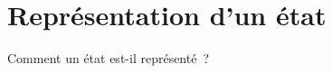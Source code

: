 \chapter{Représentation d'un état} \label{chapter:representation-etat}

Comment un état est-il représenté ?

